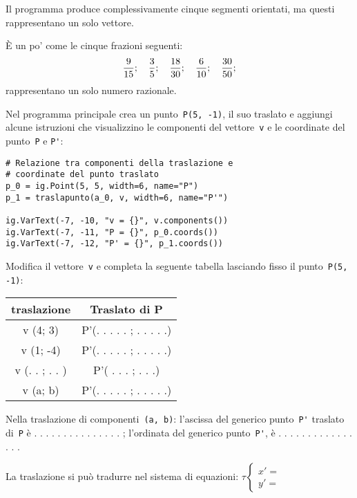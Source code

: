 Il programma produce complessivamente cinque segmenti orientati,
ma questi rappresentano un solo vettore.

È un po' come le cinque frazioni seguenti:
\begin{gather}
\begin{split}\frac{9}{15}; \quad \frac{3}{5}; \quad\frac{18}{30};
\quad\frac{6}{10}; \quad\frac{30}{50};\end{split}\notag
\end{gather}
rappresentano un solo numero razionale.

Nel programma principale crea un punto~\lstinline{P(5, -1)}, il suo traslato e
aggiungi alcune istruzioni che visualizzino le
componenti del vettore~\lstinline{v} e le coordinate del punto~\lstinline{P} e 
\lstinline{P'}:

\begin{lstlisting}
# Relazione tra componenti della traslazione e
# coordinate del punto traslato
p_0 = ig.Point(5, 5, width=6, name="P")
p_1 = traslapunto(a_0, v, width=6, name="P'")

ig.VarText(-7, -10, "v = {}", v.components())
ig.VarText(-7, -11, "P = {}", p_0.coords())
ig.VarText(-7, -12, "P' = {}", p_1.coords())
\end{lstlisting}

Modifica il vettore~\lstinline{v} e completa la seguente tabella
lasciando fisso il punto~\lstinline{P(5, -1)}:

\begin{center}\begin{tabular}{|c|c|}
\hline

traslazione
 & 
Traslato di P
\\
\hline
v (4; 3)
 & 
P'(. . . . . ; . . . . .)
\\
\hline
v (1; -4)
 & 
P'(. . . . . ; . . . . .)
\\
\hline
v (. . ; . . )
 & 
P'( . . . ;  . . .)
\\
\hline
v (a; b)
 & 
P'(. . . . . ; . . . . .)
\\
\hline\end{tabular}\end{center}


Nella traslazione di componenti~\lstinline{(a, b)}:
l'ascissa del generico punto~\lstinline{P'} traslato di~\lstinline{P}
è . . . . . . . . . . . . . . . ;
l'ordinata del generico punto~\lstinline{P'},
è . . . . . . . . . . . . . . . .

La traslazione si può tradurre nel sistema di equazioni:
\(\tau \left \{
\begin{array}{l}
x' =  \\
y' =
\end{array} \right .\)

